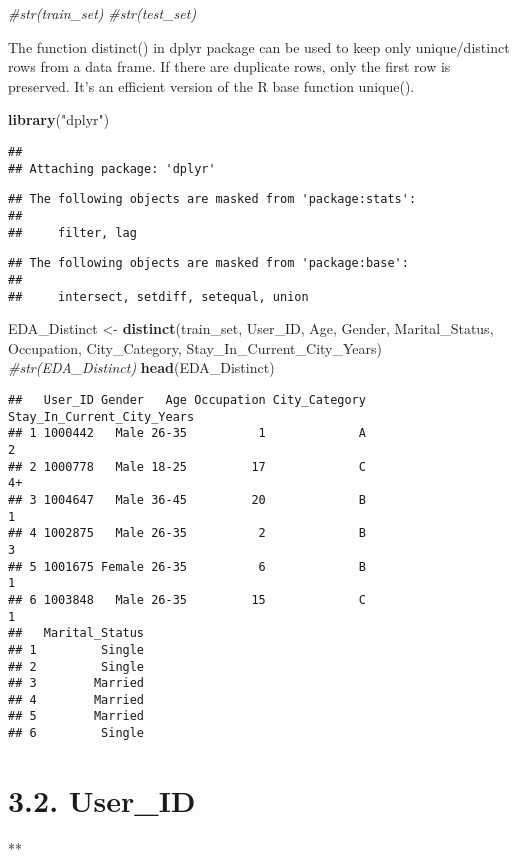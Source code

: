 \documentclass[]{article}
\newenvironment{Shaded}{\begin{snugshade}}{\end{snugshade}}
\newcommand{\KeywordTok}[1]{\textcolor[rgb]{0.13,0.29,0.53}{\textbf{#1}}}
\newcommand{\StringTok}[1]{\textcolor[rgb]{0.31,0.60,0.02}{#1}}
\newcommand{\CommentTok}[1]{\textcolor[rgb]{0.56,0.35,0.01}{\textit{#1}}}
\newcommand{\NormalTok}[1]{#1}
\begin{document}
\begin{Shaded}
\begin{Highlighting}[]
\CommentTok{#str(train_set)}
\CommentTok{#str(test_set)}
\end{Highlighting}
\end{Shaded}

The function distinct() in dplyr package can be used to keep only
unique/distinct rows from a data frame. If there are duplicate rows,
only the first row is preserved. It's an efficient version of the R base
function unique().

\begin{Shaded}
\begin{Highlighting}[]
\KeywordTok{library}\NormalTok{(}\StringTok{"dplyr"}\NormalTok{)}
\end{Highlighting}
\end{Shaded}

\begin{verbatim}
## 
## Attaching package: 'dplyr'
\end{verbatim}

\begin{verbatim}
## The following objects are masked from 'package:stats':
## 
##     filter, lag
\end{verbatim}

\begin{verbatim}
## The following objects are masked from 'package:base':
## 
##     intersect, setdiff, setequal, union
\end{verbatim}

\begin{Shaded}
\begin{Highlighting}[]
\NormalTok{EDA_Distinct <-}\StringTok{ }\KeywordTok{distinct}\NormalTok{(train_set, User_ID, Age, Gender, Marital_Status, Occupation, City_Category, Stay_In_Current_City_Years)}
\CommentTok{#str(EDA_Distinct)}
\KeywordTok{head}\NormalTok{(EDA_Distinct)}
\end{Highlighting}
\end{Shaded}

\begin{verbatim}
##   User_ID Gender   Age Occupation City_Category Stay_In_Current_City_Years
## 1 1000442   Male 26-35          1             A                          2
## 2 1000778   Male 18-25         17             C                         4+
## 3 1004647   Male 36-45         20             B                          1
## 4 1002875   Male 26-35          2             B                          3
## 5 1001675 Female 26-35          6             B                          1
## 6 1003848   Male 26-35         15             C                          1
##   Marital_Status
## 1         Single
## 2         Single
## 3        Married
## 4        Married
## 5        Married
## 6         Single
\end{verbatim}

\section{3.2. User\_ID}\label{user_id}

**
\end{document}
